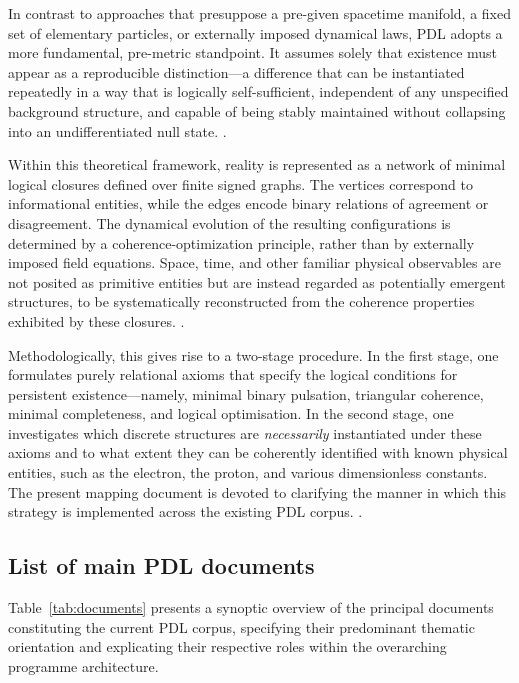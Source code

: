 \documentclass[11pt,a4paper]{article}
\begin{document}
In contrast to approaches that presuppose a pre-given spacetime manifold, a fixed set of elementary particles, or externally imposed dynamical laws, PDL adopts a more fundamental, pre-metric standpoint. It assumes solely that existence must appear as a reproducible distinction—a difference that can be instantiated repeatedly in a way that is logically self-sufficient, independent of any unspecified background structure, and capable of being stably maintained without collapsing into an undifferentiated null state.
\citep{PDL_Main_2026,PDL_position}.

Within this theoretical framework, reality is represented as a network of minimal logical closures defined over finite signed graphs. The vertices correspond to informational entities, while the edges encode binary relations of agreement or disagreement. The dynamical evolution of the resulting configurations is determined by a coherence-optimization principle, rather than by externally imposed field equations. Space, time, and other familiar physical observables are not posited as primitive entities but are instead regarded as potentially emergent structures, to be systematically reconstructed from the coherence properties exhibited by these closures.
\citep{PDL_Main_2026,PDL_intro}.

Methodologically, this gives rise to a two-stage procedure. In the first stage, one formulates purely relational axioms that specify the logical conditions for persistent existence—namely, minimal binary pulsation, triangular coherence, minimal completeness, and logical optimisation. In the second stage, one investigates which discrete structures are \emph{necessarily} instantiated under these axioms and to what extent they can be coherently identified with known physical entities, such as the electron, the proton, and various dimensionless constants. The present mapping document is devoted to clarifying the manner in which this strategy is implemented across the existing PDL corpus.
\citep{PDL_position}.

\subsection{List of main PDL documents}
\label{subsec:documents}

Table~\ref{tab:documents} presents a synoptic overview of the principal documents constituting the current PDL corpus, specifying their predominant thematic orientation and explicating their respective roles within the overarching programme architecture.
\end{document}

